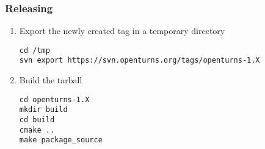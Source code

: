 \subsubsection{Releasing}

\begin{enumerate}

\item Export the newly created tag in a temporary directory
\begin{lstlisting}
cd /tmp
svn export https://svn.openturns.org/tags/openturns-1.X
\end{lstlisting}

\item Build the tarball

\begin{lstlisting}
cd openturns-1.X
mkdir build
cd build
cmake ..
make package_source
\end{lstlisting}

\end{enumerate}
